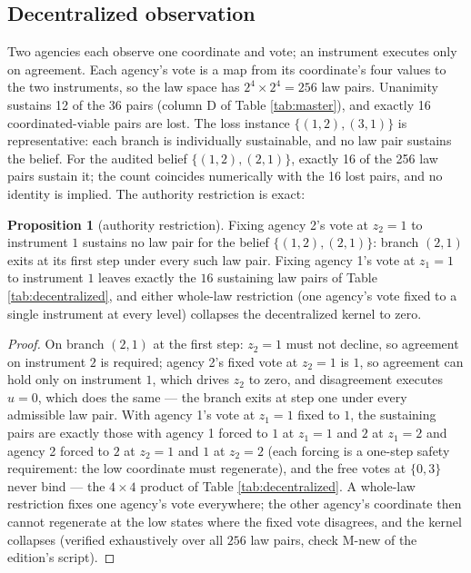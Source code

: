 \documentclass[10pt,twocolumn]{article}
\theoremstyle{definition}
\newtheorem{proposition}{Proposition}
\begin{document}
\subsection{Decentralized observation}\label{decentralized}

Two agencies each observe one coordinate and vote; an instrument
executes only on agreement. Each agency's vote is a map from its
coordinate's four values to the two instruments, so the law space has
\(2^{4} \times 2^{4} = 256\) law pairs. Unanimity sustains 12 of the
36 pairs (column D of Table \ref{tab:master}), and exactly 16
coordinated-viable pairs are lost. The loss instance
\(\{(1,2),(3,1)\}\) is representative: each branch is individually
sustainable, and no law pair sustains the belief. For the audited belief
\(\{(1,2),(2,1)\}\), exactly 16 of the 256 law pairs sustain it; the
count coincides numerically with the 16 lost pairs, and no identity is
implied. The authority restriction is exact:

\begin{proposition}[authority restriction]\label{prop:authority}
Fixing agency 2's vote at \(z_2 = 1\) to instrument \(1\) sustains no
law pair for the belief \(\{(1,2),(2,1)\}\): branch \((2,1)\) exits
at its first step under every such law pair. Fixing agency 1's vote at
\(z_1 = 1\) to instrument \(1\) leaves exactly the \(16\) sustaining
law pairs of Table \ref{tab:decentralized}, and either whole-law
restriction (one agency's vote fixed to a single instrument at every
level) collapses the decentralized kernel to zero.
\end{proposition}

\begin{proof}
On branch \((2,1)\) at the first step: \(z_2 = 1\) must not
decline, so agreement on instrument \(2\) is required; agency 2's
fixed vote at \(z_2 = 1\) is \(1\), so agreement can hold only on
instrument \(1\), which drives \(z_2\) to zero, and disagreement
executes \(u = 0\), which does the same --- the branch exits at step
one under every admissible law pair. With agency 1's vote at \(z_1 = 1\) fixed to \(1\), the
sustaining pairs are exactly those with agency 1 forced to \(1\) at
\(z_1 = 1\) and \(2\) at \(z_1 = 2\) and agency 2 forced to \(2\)
at \(z_2 = 1\) and \(1\) at \(z_2 = 2\) (each forcing is a
one-step safety requirement: the low coordinate must regenerate), and
the free votes at \(\{0, 3\}\) never bind --- the \(4 \times 4\)
product of Table \ref{tab:decentralized}. A whole-law restriction
fixes one agency's vote everywhere; the other agency's coordinate then
cannot regenerate at the low states where the fixed vote disagrees, and
the kernel collapses (verified exhaustively over all \(256\) law
pairs, check M-new of the edition's script).
\end{proof}
\end{document}
